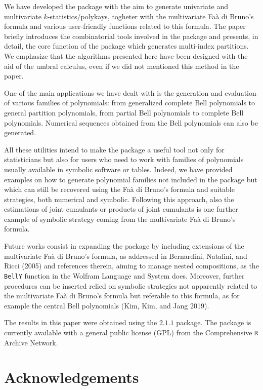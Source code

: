 We have developed the  package with the aim to generate univariate and multivariate \(k\)-statistics/polykays, togheter with the multivariate Faà di Bruno's formula and various user-friendly functions related to this formula. The paper briefly introduces the combinatorial tools involved in the package and presents, in detail, the core function of the package which generates multi-index partitions. We emphasize that the algorithms presented here have been designed with the aid of the umbral calculus, even if we did not mentioned this method in the paper.

One of the main applications we have dealt with is the generation and evaluation of various families of polynomials: from generalized complete Bell polynomials to general partition polynomials, from partial Bell polynomials to complete Bell polynomials. Numerical sequences obtained from the Bell polynomials can also be generated.

All these utilities intend to make the  package a useful tool not only for statisticians but also for users who need to work with families of polynomials usually available in symbolic software or tables. Indeed, we have provided examples on how to generate polynomial families not included in the package but which can still be recovered using the Faà di Bruno's formula and suitable strategies, both numerical and symbolic. Following this approach, also the estimations of joint cumulants or products of joint cumulants is one further example of symbolic strategy coming from the multivariate Faà di Bruno's formula.

Future works consist in expanding the  package by including extensions of the multivariate Faà di Bruno's formula, as addressed in Bernardini, Natalini, and Ricci (2005) and references therein, aiming to manage nested compositions, as the \texttt{BellY} function in the Wolfram Language and System does. Moreover, further procedures can be inserted relied on symbolic strategies not apparently related to the multivariate Faà di Bruno's formula but referable to this formula, as for example the central Bell polynomials (Kim, Kim, and Jang 2019).

The results in this paper were obtained using the  \(2.1.1\) package. The package is currently available with a general public license (GPL) from the Comprehensive \texttt{R} Archive Network.

\hypertarget{acknowledgements}{%
\section{Acknowledgements}\label{acknowledgements}}


